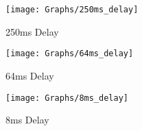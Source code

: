\begin{figure}[p]
  \centering
  \texttt{[image: Graphs/250ms\_delay]}
  \caption{250ms Delay}
  \label{fig:250ms_graph}
\end{figure}

\begin{figure}[p]
  \centering
  \texttt{[image: Graphs/64ms\_delay]}
  \caption{64ms Delay}
  \label{fig:64ms_graph}
\end{figure}

\begin{figure}[p]
  \centering
  \texttt{[image: Graphs/8ms\_delay]}
  \caption{8ms Delay}
  \label{fig:8ms_graph}
\end{figure}
